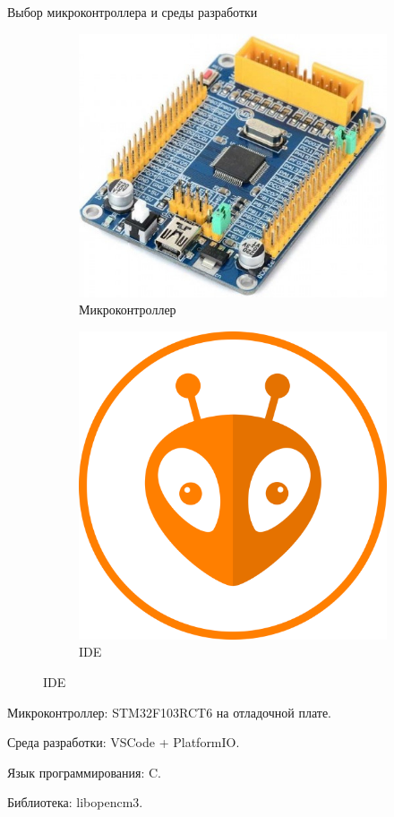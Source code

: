 \documentclass[10pt]{beamer}
\begin{document}
\begin{frame}{Выбор микроконтроллера и среды разработки}
\begin{figure}
     \begin{subfigure}[H]{0.4\textwidth}
         \centering
         \includegraphics[width=\textwidth]{stmka}
         \caption*{Микроконтроллер}
     \end{subfigure}
     \hfill
     \begin{subfigure}[H]{0.35\textwidth}
         \centering
         \includegraphics[width=\textwidth]{PlatformIO}
         \caption*{IDE}
     \end{subfigure}
\end{figure}
  Микроконтроллер: STM32F103RCT6 на отладочной плате.
  
  Среда разработки: VSCode + PlatformIO.
  
  Язык программирования: C.
  
  Библиотека: libopencm3.
\end{frame}
\end{document}
